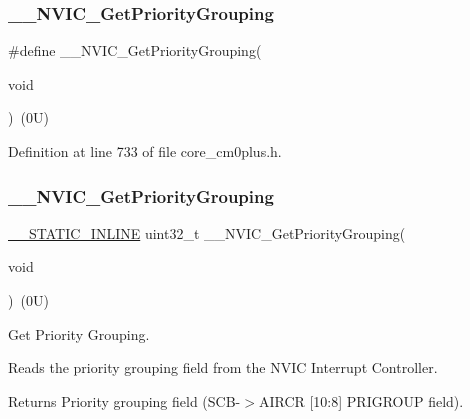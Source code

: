 \subsubsection{\texorpdfstring{\+\_\+\+\_\+\+N\+V\+I\+C\+\_\+\+Get\+Priority\+Grouping}{\_\_NVIC\_GetPriorityGrouping}\hspace{0.1cm}{\footnotesize\ttfamily [3/5]}}
{\footnotesize\ttfamily \#define \+\_\+\+\_\+\+N\+V\+I\+C\+\_\+\+Get\+Priority\+Grouping(\begin{DoxyParamCaption}\item[{}]{void }\end{DoxyParamCaption})~(0\+U)}



Definition at line 733 of file core\+\_\+cm0plus.\+h.

\mbox{\label{group___c_m_s_i_s___core___n_v_i_c_functions_gae1de06155d072758b3453edb07d12459}} 
\subsubsection{\texorpdfstring{\+\_\+\+\_\+\+N\+V\+I\+C\+\_\+\+Get\+Priority\+Grouping}{\_\_NVIC\_GetPriorityGrouping}\hspace{0.1cm}{\footnotesize\ttfamily [4/5]}}
{\footnotesize\ttfamily \hyperlink{cmsis__iccarm_8h_aba87361bfad2ae52cfe2f40c1a1dbf9c}{\+\_\+\+\_\+\+S\+T\+A\+T\+I\+C\+\_\+\+I\+N\+L\+I\+NE} uint32\+\_\+t \+\_\+\+\_\+\+N\+V\+I\+C\+\_\+\+Get\+Priority\+Grouping(\begin{DoxyParamCaption}\item[{}]{void }\end{DoxyParamCaption})~(0\+U)}



Get Priority Grouping. 

Reads the priority grouping field from the N\+V\+IC Interrupt Controller. \begin{DoxyReturn}{Returns}
Priority grouping field (S\+C\+B-\/$>$A\+I\+R\+CR \mbox{[}10\+:8\mbox{]} P\+R\+I\+G\+R\+O\+UP field). 
\end{DoxyReturn}


